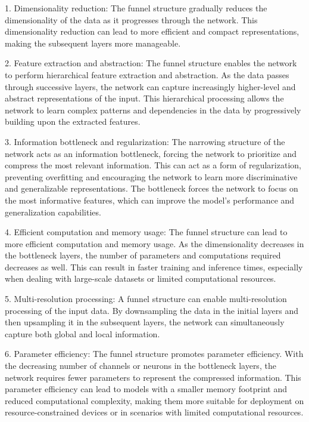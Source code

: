 \documentclass[a4paper]{article}
\begin{document}
1. Dimensionality reduction: The funnel structure gradually reduces the dimensionality of the data as it progresses through the network. This dimensionality reduction can lead to more efficient and compact representations, making the subsequent layers more manageable.

2. Feature extraction and abstraction: The funnel structure enables the network to perform hierarchical feature extraction and abstraction. As the data passes through successive layers, the network can capture increasingly higher-level and abstract representations of the input. This hierarchical processing allows the network to learn complex patterns and dependencies in the data by progressively building upon the extracted features.

3. Information bottleneck and regularization: The narrowing structure of the network acts as an information bottleneck, forcing the network to prioritize and compress the most relevant information. This can act as a form of regularization, preventing overfitting and encouraging the network to learn more discriminative and generalizable representations. The bottleneck forces the network to focus on the most informative features, which can improve the model's performance and generalization capabilities.

4. Efficient computation and memory usage: The funnel structure can lead to more efficient computation and memory usage. As the dimensionality decreases in the bottleneck layers, the number of parameters and computations required decreases as well. This can result in faster training and inference times, especially when dealing with large-scale datasets or limited computational resources.

5. Multi-resolution processing: A funnel structure can enable multi-resolution processing of the input data. By downsampling the data in the initial layers and then upsampling it in the subsequent layers, the network can simultaneously capture both global and local information.

6. Parameter efficiency: The funnel structure promotes parameter efficiency. With the decreasing number of channels or neurons in the bottleneck layers, the network requires fewer parameters to represent the compressed information. This parameter efficiency can lead to models with a smaller memory footprint and reduced computational complexity, making them more suitable for deployment on resource-constrained devices or in scenarios with limited computational resources.
\end{document}
